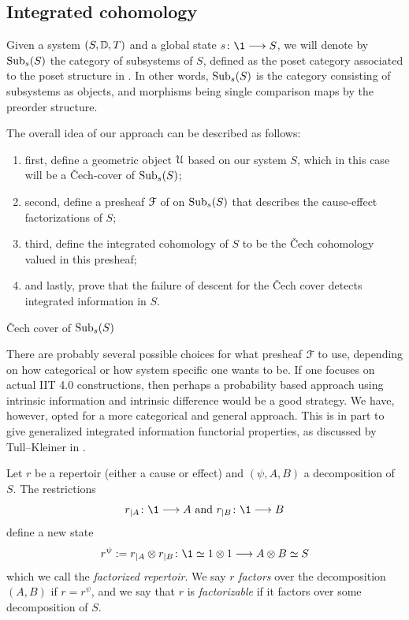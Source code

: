 \subsection{Integrated cohomology}
Given a system $(S, \mathbb{D}, T)$ and a global state $s\: \1 \to S$, we will denote by $\operatorname{Sub}_s(S)$ the category of subsystems of $S$, defined as the poset category associated to the poset structure in \citeme. In other words, $\operatorname{Sub}_s(S)$ is the category consisting of subsystems as objects, and morphisms being single comparison maps by the preorder structure. 

The overall idea of our approach can be described as follows: 
\begin{enumerate}
    \item first, define a geometric object $\EuScript{U}$ based on our system $S$, which in this case will be a \v{C}ech-cover of $\operatorname{Sub}_s(S)$;
    \item second, define a presheaf $\EuScript{F}$ of on $\operatorname{Sub}_s(S)$ that describes the cause-effect factorizations of $S$;
    \item third, define the integrated cohomology of $S$ to be the \v{C}ech cohomology valued in this presheaf;
    \item and lastly, prove that the failure of descent for the \v{C}ech cover detects integrated information in $S$. 
\end{enumerate}



\begin{definition}
    \v{C}ech cover of $\operatorname{Sub}_s(S)$
\end{definition}

There are probably several possible choices for what presheaf $\EuScript{F}$ to use, depending on how categorical or how system specific one wants to be. If one focuses on actual IIT 4.0 constructions, then perhaps a probability based approach using intrinsic information and intrinsic difference would be a good strategy. We have, however, opted for a more categorical and general approach. This is in part to give generalized integrated information functorial properties, as discussed by Tull--Kleiner in \citeme. 

\begin{definition}
    Let $r$ be a repertoir (either a cause or effect) and $(\psi, A,B)$ a decomposition of $S$. The restrictions
    \[r_{\mid A}\: \1 \to A \text{ and } r_{\mid B}\: \1\to B\]
    define a new state 
    \[r^\psi:= r_{\mid A}\otimes r_{\mid B}\: \1\simeq 1\otimes 1 \to A\otimes B \simeq S\]
    which we call the \emph{factorized repertoir}. We say $r$ \emph{factors} over the decomposition $(A,B)$ if $r= r^\psi$, and we say that $r$ is \emph{factorizable} if it factors over some decomposition of $S$. 
\end{definition}

